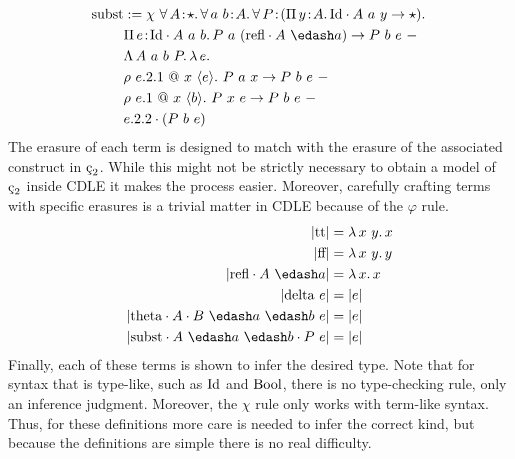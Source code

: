 \begin{align*}
    \csubst &:= \chi\ 
        \abs{\forall}{A}{\star}{
            \abs{\forall}{a\ b}{A}{
                \abs{\forall}{P}{ (\abs{\Pi}{y}{A}{\cId \cdot A\ a\ y \to \star}) }{
                    \\ &\abs{\Pi}{e}{\cId \cdot A\ a\ b}{
                        P\ a\ (\crefl \cdot A\ \edash a) \to P\ b\ e
                    }
                }
            }
        }\ -
        \\ &\absu{\Lambda}{A\ a\ b\ P}{
            \absu{\lambda}{e}{
                \\ &\rho\ e.2.1\ @\ x\ \langle e \rangle.\ P\ a\ x \to P\ b\ e\ -\
                \\ &\rho\ e.1\ @\ x\ \langle b \rangle.\ P\ x\ e \to P\ b\ e\ -\
                \\ &e.2.2 \cdot (P\ b\ e)
            }
    }
\end{align*}
The erasure of each term is designed to match with the erasure of the associated construct in $\ced$.
While this might not be strictly necessary to obtain a model of $\ced$ inside CDLE it makes the process easier.
Moreover, carefully crafting terms with specific erasures is a trivial matter in CDLE because of the $\varphi$ rule.
\begin{align*}
    |\ctt| &= \absu{\lambda}{x\ y}{x} \\
    |\cff| &= \absu{\lambda}{x\ y}{y} \\
    |\crefl \cdot A\ \edash a| &= \absu{\lambda}{x}{x} \\
    |\cdelta\ e| &= |e| \\
    |\ctheta \cdot A \cdot B\ \edash a\ \edash b\ e| &= |e| \\
    |\csubst \cdot A\ \edash a\ \edash b \cdot P\ e| &= |e|
\end{align*}
Finally, each of these terms is shown to infer the desired type.
Note that for syntax that is type-like, such as $\textnormal{Id}$ and $\textnormal{Bool}$, there is no type-checking rule, only an inference judgment.
Moreover, the $\chi$ rule only works with term-like syntax.
Thus, for these definitions more care is needed to infer the correct kind, but because the definitions are simple there is no real difficulty.
